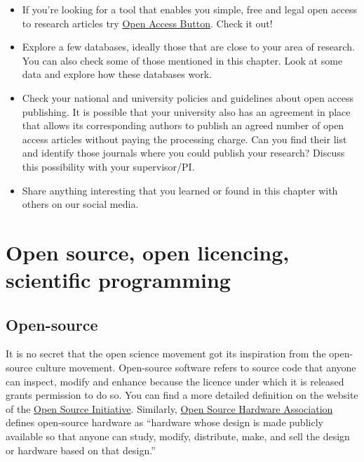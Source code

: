 \documentclass[
]{book}
\begin{document}
\begin{itemize}
\item
  If you're looking for a tool that enables you simple, free and legal open access to research articles try \href{https://openaccessbutton.org/}{Open Access Button}. Check it out!
\item
  Explore a few databases, ideally those that are close to your area of research. You can also check some of those mentioned in this chapter. Look at some data and explore how these databases work.
\item
  Check your national and university policies and guidelines about open access publishing. It is possible that your university also has an agreement in place that allows its corresponding authors to publish an agreed number of open access articles without paying the processing charge. Can you find their list and identify those journals where you could publish your research? Discuss this possibility with your supervisor/PI.
\item
  Share anything interesting that you learned or found in this chapter with others on our social media.
\end{itemize}

\hypertarget{open-source-open-licencing-scientific-programming}{%
\chapter{Open source, open licencing, scientific programming}\label{open-source-open-licencing-scientific-programming}}

\hypertarget{open-source}{%
\section{Open-source}\label{open-source}}

It is no secret that the open science movement got its inspiration from the open-source culture movement. Open-source software refers to source code that anyone can inspect, modify and enhance because the licence under which it is released grants permission to do so. You can find a more detailed definition on the website of the \href{https://opensource.org/osd}{Open Source Initiative}. Similarly, \href{https://www.oshwa.org/definition/}{Open Source Hardware Association} defines open-source hardware as ``hardware whose design is made publicly available so that anyone can study, modify, distribute, make, and sell the design or hardware based on that design.''
\end{document}
